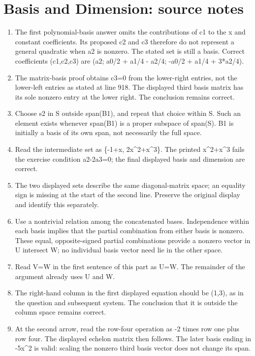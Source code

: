 \section*{Basis and Dimension: source notes}
\begin{enumerate}
\item The first polynomial-basis answer omits the contributions of c1 to the x and constant coefficients. Its proposed c2 and c3 therefore do not represent a general quadratic when a2 is nonzero. The stated set is still a basis. Correct coefficients (c1,c2,c3) are (a2; a0/2 + a1/4 - a2/4; -a0/2 + a1/4 + 3*a2/4).
\item The matrix-basis proof obtains c3=0 from the lower-right entries, not the lower-left entries as stated at line 918. The displayed third basis matrix has its sole nonzero entry at the lower right. The conclusion remains correct.
\item Choose s2 in S outside span(B1), and repeat that choice within S. Such an element exists whenever span(B1) is a proper subspace of span(S). B1 is initially a basis of its own span, not necessarily the full space.
\item Read the intermediate set as \{-1+x, 2x\textasciicircum{}2+x\textasciicircum{}3\}. The printed x\textasciicircum{}2+x\textasciicircum{}3 fails the exercise condition a2-2a3=0; the final displayed basis and dimension are correct.
\item The two displayed sets describe the same diagonal-matrix space; an equality sign is missing at the start of the second line. Preserve the original display and identify this separately.
\item Use a nontrivial relation among the concatenated bases. Independence within each basis implies that the partial combination from either basis is nonzero. These equal, opposite-signed partial combinations provide a nonzero vector in U intersect W; no individual basis vector need lie in the other space.
\item Read V=W in the first sentence of this part as U=W. The remainder of the argument already uses U and W.
\item The right-hand column in the first displayed equation should be (1,3), as in the question and subsequent system. The conclusion that it is outside the column space remains correct.
\item At the second arrow, read the row-four operation as -2 times row one plus row four. The displayed echelon matrix then follows. The later basis ending in -5x\textasciicircum{}2 is valid: scaling the nonzero third basis vector does not change its span.

\end{enumerate}
